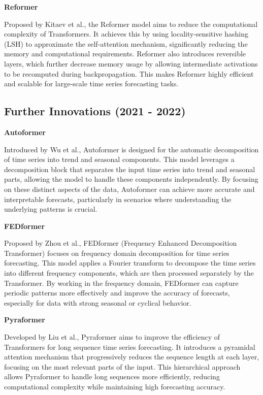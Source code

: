 \noindent\textbf
{Reformer}
 
\noindent Proposed by Kitaev et al.\cite{kitaev2020reformerefficienttransformer}, the Reformer model aims to reduce the computational complexity of Transformers. It achieves this by using locality-sensitive hashing (LSH) to approximate the self-attention mechanism, significantly reducing the memory and computational requirements. Reformer also introduces reversible layers, which further decrease memory usage by allowing intermediate activations to be recomputed during backpropagation. This makes Reformer highly efficient and scalable for large-scale time series forecasting tasks.
\vspace{10pt}


\subsection{Further Innovations (2021 - 2022)}
\noindent\textbf
{Autoformer}
 
\noindent Introduced by Wu et al.\cite{wu2022autoformerdecompositiontransformersautocorrelation}, Autoformer is designed for the automatic decomposition of time series into trend and seasonal components. This model leverages a decomposition block that separates the input time series into trend and seasonal parts, allowing the model to handle these components independently. By focusing on these distinct aspects of the data, Autoformer can achieve more accurate and interpretable forecasts, particularly in scenarios where understanding the underlying patterns is crucial.
\vspace{10pt}


\noindent\textbf
{FEDformer}
 
\noindent Proposed by Zhou et al.\cite{zhou2022fedformerfrequencyenhanceddecomposed}, FEDformer (Frequency Enhanced Decomposition Transformer) focuses on frequency domain decomposition for time series forecasting. This model applies a Fourier transform to decompose the time series into different frequency components, which are then processed separately by the Transformer. By working in the frequency domain, FEDformer can capture periodic patterns more effectively and improve the accuracy of forecasts, especially for data with strong seasonal or cyclical behavior.
\vspace{10pt}


\noindent\textbf
{Pyraformer}

\noindent Developed by Liu et al.\cite{liu2022pyraformer}, Pyraformer aims to improve the efficiency of Transformers for long sequence time series forecasting. It introduces a pyramidal attention mechanism that progressively reduces the sequence length at each layer, focusing on the most relevant parts of the input. This hierarchical approach allows Pyraformer to handle long sequences more efficiently, reducing computational complexity while maintaining high forecasting accuracy.
\vspace{10pt}


